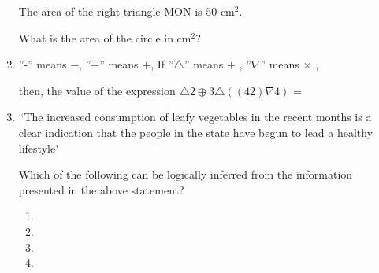 \documentclass[journal]{IEEEtran}
\begin{document}
\begin{enumerate}[leftmargin=0pt]
The area of the right triangle MON is $50 \text{ cm}^2$.

What is the area of the circle in $\text{cm}^2$?

\begin{enumerate}
\end{enumerate}

\hfill{}

\item ''-'' means $-$, ''+'' means $+$, If
''$\triangle$'' means $+$ , ''$\nabla$'' means $\times$ ,

then, the value of the expression $\triangle 2 \oplus 3 \triangle ((42) \nabla 4)$ =

\begin{enumerate}
\end{enumerate}

\hfill{}

\item ``The increased consumption of leafy vegetables in the recent months is a
clear indication that the people in the state have begun to lead a healthy
lifestyle"

Which of the following can be logically inferred from the information
presented in the above statement?

\begin{enumerate}

\item {}
\item {}
\item {}
\item {}


\end{enumerate}
\end{enumerate}
\end{document}
